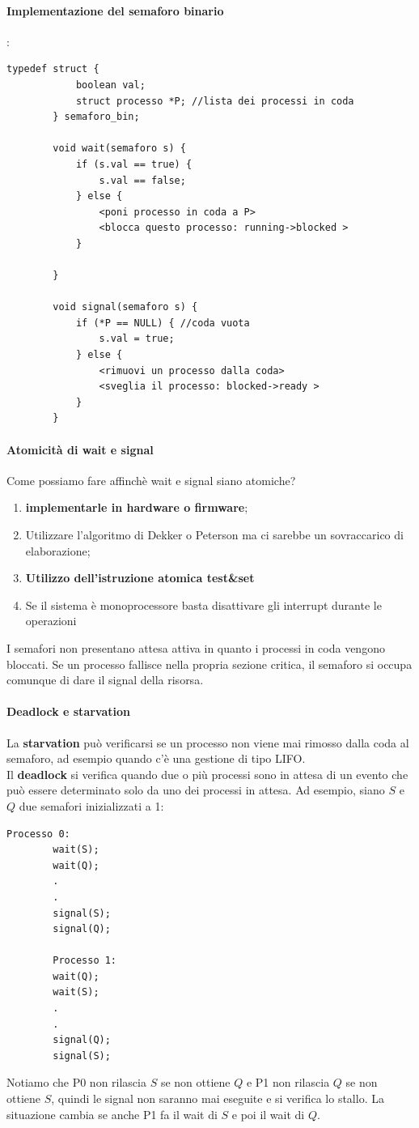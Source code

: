 \documentclass[12pt, letterpaper]{report}
\begin{document}
	\paragraph{Implementazione del semaforo binario}:
	\begin{lstlisting}[style=pascalstyle]
		typedef struct {
			boolean val;
			struct processo	*P; //lista dei processi in coda
		} semaforo_bin;

		void wait(semaforo s) {
			if (s.val == true) {
				s.val == false;
			} else {
				<poni processo in coda a P>
				<blocca questo processo: running->blocked >
			}

		}

		void signal(semaforo s) {
			if (*P == NULL) { //coda vuota
				s.val = true;
			} else {
				<rimuovi un processo dalla coda>
				<sveglia il processo: blocked->ready >
			}
		}
	\end{lstlisting}
	\paragraph{Atomicità di wait e signal} Come possiamo fare affinchè wait e signal siano atomiche? \\
	\begin{enumerate}
		\item \textbf{implementarle in hardware o firmware};
		\item Utilizzare l'algoritmo di Dekker o Peterson ma ci sarebbe un sovraccarico di elaborazione;
		\item \textbf{Utilizzo dell'istruzione atomica test\&set}
		\item Se il sistema è monoprocessore basta disattivare gli interrupt durante le operazioni
	\end{enumerate}
	I semafori non presentano attesa attiva in quanto i processi in coda vengono bloccati. Se un processo fallisce nella propria sezione critica, il semaforo si occupa comunque di dare il signal della risorsa.
	\paragraph{Deadlock e starvation}
	La \textbf{starvation} può verificarsi se un processo non viene mai rimosso dalla coda al semaforo, ad esempio quando c'è una gestione di tipo LIFO. \\
	Il \textbf{deadlock} si verifica quando due o più processi sono in attesa di un evento che può essere determinato solo da uno dei processi in attesa. Ad esempio, siano $S$ e $Q$ due semafori inizializzati a 1:
	\begin{lstlisting}[style=pascalstyle]
		Processo 0:
		wait(S);
		wait(Q);
		.
		.
		signal(S);
		signal(Q);

		Processo 1:
		wait(Q);
		wait(S);
		.
		.
		signal(Q);
		signal(S);
	\end{lstlisting}
	Notiamo che P0 non rilascia $S$ se non ottiene $Q$ e P1 non rilascia $Q$ se non ottiene $S$, quindi le signal non saranno mai eseguite e si verifica lo stallo. La situazione cambia se anche P1 fa il wait di $S$ e poi il wait di $Q$.
\end{document}
